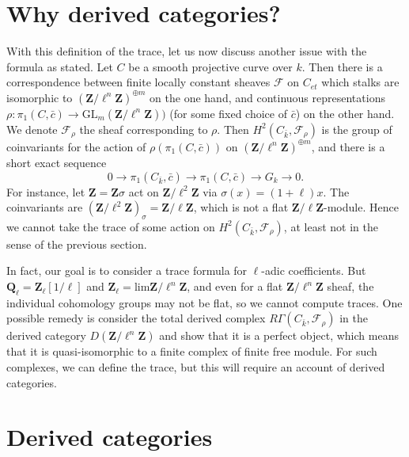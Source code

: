 \section{Why derived categories?}
\label{section-derived-categories-why}

\noindent
With this definition of the trace, let us now discuss another issue with the
formula as stated. Let $C$ be a smooth projective curve over $k$. Then there is
a correspondence between finite locally constant sheaves $\mathcal{F}$ on
$C_{et}$ which stalks are isomorphic to
${(\mathbf{Z}/\ell^n\mathbf{Z})}^{\oplus m}$ on the one hand, and continuous
representations $\rho : \pi_1 (C,\bar c) \to
\text{GL}_m(\mathbf{Z}/\ell^n\mathbf{Z}))$ (for some fixed choice of $\bar c$)
on the other hand. We denote $\mathcal{F}_\rho$ the sheaf corresponding to
$\rho$. Then $H^2 (C_{\bar k}, \mathcal{F}_\rho)$ is the group of coinvariants
for the action of $\rho(\pi_1 (C,\bar c))$ on
${(\mathbf{Z}/\ell^n\mathbf{Z})}^{\oplus m}$, and there is a short exact
sequence
$$
0 \longrightarrow \pi_1 (C_{\bar k},\bar c) \longrightarrow \pi_1 (C,\bar c)
\longrightarrow G_k \longrightarrow 0.
$$
For instance, let $\mathbf{Z} = \mathbf{Z} \sigma$ act on
$\mathbf{Z}/\ell^2\mathbf{Z}$ via $\sigma(x) = (1+\ell) x$. The coinvariants
are $(\mathbf{Z}/\ell^2\mathbf{Z})_{\sigma} = \mathbf{Z}/\ell\mathbf{Z}$, which
is not a flat $\mathbf{Z}/\ell\mathbf{Z}$-module. Hence we cannot take the
trace of some action on $H^2(C_{\bar k}, \mathcal{F}_\rho)$, at least not in
the sense of the previous section.

\medskip\noindent
In fact, our goal is to consider a trace formula for $\ell$-adic coefficients.
But $\mathbf{Q}_\ell = \mathbf{Z}_\ell[1/\ell]$ and $\mathbf{Z}_\ell =
\text{lim} \mathbf{Z}/\ell^n\mathbf{Z}$, and even for a flat
$\mathbf{Z}/\ell^n\mathbf{Z}$ sheaf, the individual cohomology groups may not
be flat, so we cannot compute traces. One possible remedy is consider the total
derived complex $R\Gamma(C_{\bar k}, \mathcal{F}_\rho)$ in the derived category
$D(\mathbf{Z}/\ell^n\mathbf{Z})$ and show that it is a perfect object, which
means that it is quasi-isomorphic to a finite complex of finite free module.
For such complexes, we can define the trace, but this will require an account
of derived categories.






\section{Derived categories}
\label{section-derived-categories}

